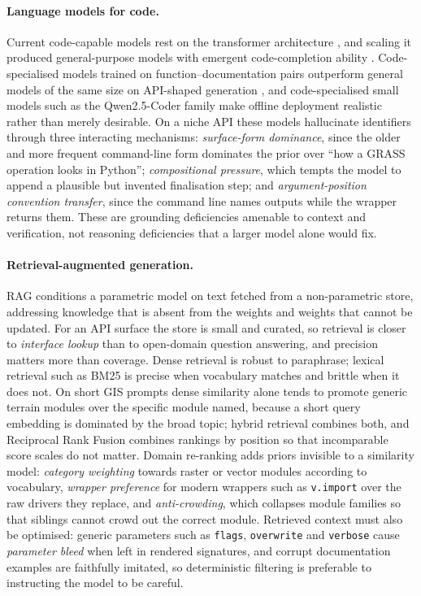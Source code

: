 \paragraph{Language models for code.} Current code-capable models rest on the
transformer architecture \cite{vaswani2017attention}, and scaling it produced
general-purpose models with emergent code-completion ability
\cite{brown2020gpt3}. Code-specialised models trained on function--documentation
pairs outperform general models of the same size on API-shaped generation
\cite{chen2021codex}, and code-specialised small models such as the
Qwen2.5-Coder family \cite{ji2024qwen25coder} make offline deployment realistic
rather than merely desirable. On a niche API these models hallucinate
identifiers \cite{zan2023surveycode,ji2023hallucination} through three
interacting mechanisms: \emph{surface-form dominance}, since the older and more
frequent command-line form dominates the prior over ``how a GRASS operation
looks in Python''; \emph{compositional pressure}, which tempts the model to
append a plausible but invented finalisation step; and \emph{argument-position
convention transfer}, since the command line names outputs while the wrapper
returns them. These are grounding deficiencies amenable to context and
verification, not reasoning deficiencies that a larger model alone would fix.

\paragraph{Retrieval-augmented generation.} RAG \cite{lewis2020rag} conditions a
parametric model on text fetched from a non-parametric store, addressing
knowledge that is absent from the weights and weights that cannot be updated. For an API surface the store is small and
curated, so retrieval is closer to \emph{interface lookup} than to open-domain
question answering, and precision matters more than coverage. Dense retrieval
\cite{karpukhin2020dpr} is robust to paraphrase; lexical retrieval such as BM25
\cite{robertson2009bm25} is precise when vocabulary matches and brittle when it
does not. On short GIS prompts dense similarity alone tends to promote generic
terrain modules over the specific module named, because a short query embedding
is dominated by the broad topic; hybrid retrieval combines both, and Reciprocal
Rank Fusion \cite{cormack2009rrf} combines rankings by position so that
incomparable score scales do not matter. Domain re-ranking adds priors invisible
to a similarity model: \emph{category weighting} towards raster or vector modules
according to vocabulary, \emph{wrapper preference} for modern wrappers such as
\texttt{v.import} over the raw drivers they replace, and \emph{anti-crowding},
which collapses module families so that siblings cannot crowd out the correct
module. Retrieved context must also be optimised: generic parameters such as
\texttt{flags}, \texttt{overwrite} and \texttt{verbose} cause \emph{parameter
bleed} when left in rendered signatures, and corrupt documentation examples are
faithfully imitated, so deterministic filtering is preferable to instructing the
model to be careful.

